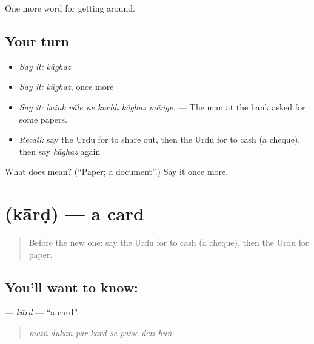 \begin{grammarlens}[title={What you've built}]
One more word for getting around.
\end{grammarlens}

\subsection*{Your turn}
\begin{itemize}
\raggedright
  \item \emph{Say it:} \emph{kāghaz}
  \item \emph{Say it:} \emph{kāghaz}, once more
  \item \emph{Say it:} \emph{baink vāle ne kuchh kāghaz māṅge.} — The man at the bank asked for some papers.
  \item \emph{Recall:} say the Urdu for to share out, then the Urdu for to cash (a cheque), then say \emph{kāghaz} again
\end{itemize}

\begin{tcolorbox}[breakable,colback=teal!4,colframe=teal!35!black,title={Before you move on}]
What does  mean? (\textquotedblleft{}Paper; a document\textquotedblright{}.) Say it once more.
\end{tcolorbox}
\section[\texorpdfstring{\ur{کارڈ} (kārḍ)}{کارڈ (kārḍ)}]{ (kārḍ) — a card}

\label{lesson:UR-C421-kard}



\begin{quote}
Before the new one: say the Urdu for to cash (a cheque), then the Urdu for paper.
\end{quote}

\subsection*{You'll want to know: }
\textbf{} — \emph{kārḍ} — \textquotedblleft{}a card\textquotedblright{}.

\begin{quote}
       
\end{quote}

\begin{quote}
\emph{maiṅ dukān par kārḍ se paise detī hūṅ.}
\end{quote}

